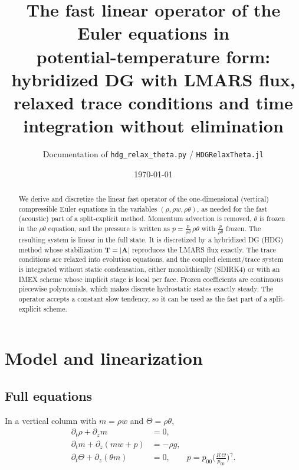 \documentclass[11pt,a4paper]{article}
\title{The fast linear operator of the Euler equations in\\
potential-temperature form: hybridized DG with LMARS flux,\\
relaxed trace conditions and time integration without elimination}
\author{Documentation of \texttt{hdg\_relax\_theta.py} / \texttt{HDGRelaxTheta.jl}}
\date{\today}
\begin{document}
\maketitle

\begin{abstract}
We derive and discretize the linear fast operator of the one-dimensional (vertical)
compressible Euler equations in the variables $(\rho,\rho w,\rho\theta)$, as needed for
the fast (acoustic) part of a split-explicit method. Momentum advection is removed, $\theta$ is
frozen in the $\rho\theta$ equation, and the pressure is written as
$p=\frac{p}{\rho\theta}\,\rho\theta$ with $\frac{p}{\rho\theta}$ frozen. The resulting system is
linear in the full state. It is discretized by a hybridized DG (HDG) method whose stabilization
$\bm T=|\bm A|$ reproduces the LMARS flux exactly. The trace conditions are relaxed into evolution
equations, and the coupled element/trace system is integrated without static condensation,
either monolithically (SDIRK4) or with an IMEX scheme whose implicit stage is local per face.
Frozen coefficients are continuous piecewise polynomials, which makes discrete hydrostatic
states exactly steady. The operator accepts a constant slow tendency, so it can be used as the
fast part of a split-explicit scheme.
\end{abstract}

\tableofcontents

\section{Model and linearization}
\subsection{Full equations}
In a vertical column with $m=\rho w$ and $\Theta=\rho\theta$,
\begin{align}
\partial_t\rho + \partial_z m &= 0,\\
\partial_t m + \partial_z(m w + p) &= -\rho g,\\
\partial_t\Theta + \partial_z(\theta m) &= 0,\qquad
p = p_{00}\Big(\frac{R\,\Theta}{p_{00}}\Big)^{\gamma}.
\end{align}
\end{document}

